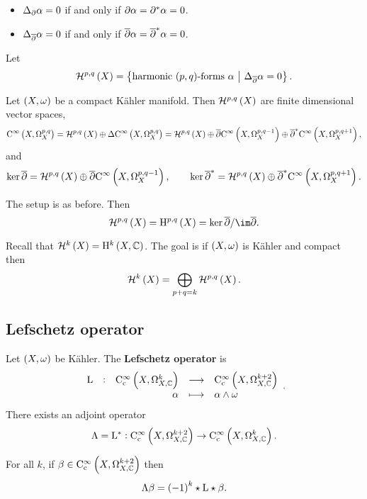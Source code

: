 \pagebreak

\begin{lemma}
\label{lem:6.20}
\hfill
\begin{itemize}
\item $ \Delta_\partial\alpha = 0 $ if and only if $ \partial\alpha = \partial^*\alpha = 0 $.
\item $ \Delta_{\overline{\partial}}\alpha = 0 $ if and only if $ \overline{\partial}\alpha = \overline{\partial}^*\alpha = 0 $.
\end{itemize}
\end{lemma}

Let
$$ \HHH^{p, q}\br{X} = \cbr{\text{harmonic $ \br{p, q} $-forms} \ \alpha \st \Delta_{\dab}\alpha = 0}. $$

\begin{theorem}
\label{thm:6.21}
Let $ \br{X, \omega} $ be a compact K\"ahler manifold. Then $ \HHH^{p, q}\br{X} $ are finite dimensional vector spaces,
$$ \CO{X}{p, q} = \HHH^{p, q}\br{X} \oplus \Delta\CO{X}{p, q} = \HHH^{p, q}\br{X} \oplus \dab\CO{X}{p, q - 1} \oplus \dab^*\CO{X}{p, q + 1}, $$
and
$$ \ker \dab = \HHH^{p, q}\br{X} \oplus \dab\CO{X}{p, q - 1}, \qquad \ker \dab^* = \HHH^{p, q}\br{X} \oplus \dab^*\CO{X}{p, q + 1}. $$
\end{theorem}

\begin{theorem}
\label{thm:6.22}
The setup is as before. Then
$$ \HHH^{p, q}\br{X} = \H^{p, q}\br{X} = \ker \dab / \im \dab. $$
\end{theorem}

Recall that $ \HHH^k\br{X} = \H^k\br{X, \CC} $. The goal is if $ \br{X, \omega} $ is K\"ahler and compact then
$$ \HHH^k\br{X} = \bigoplus_{p + q = k} \HHH^{p, q}\br{X}. $$

\subsection{Lefschetz operator}

\begin{definition}
Let $ \br{X, \omega} $ be K\"ahler. The \textbf{Lefschetz operator} is
$$ \function[\L]{\COCc{X}{k}}{\COCc{X}{k + 2}}{\alpha}{\alpha \wedge \omega}. $$
There exists an adjoint operator
$$ \Lambda = \L^* : \COCc{X}{k + 2} \to \COCc{X}{k}. $$
\end{definition}

\begin{lemma}
For all $ k $, if $ \beta \in \COCc{X}{k + 2} $ then
$$ \Lambda\beta = \br{-1}^k\star\L\star\beta. $$
\end{lemma}

